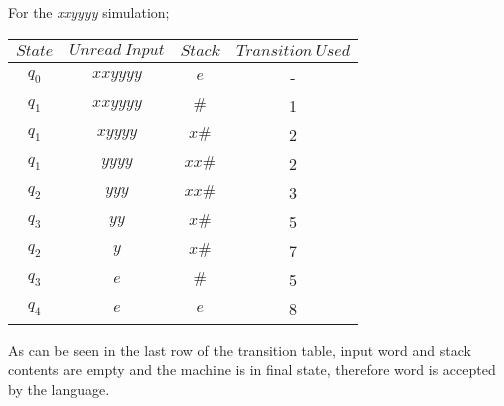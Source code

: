 \documentclass[a4paper,12pt]{article}
\begin{document}
\begin{tcolorbox}
For the \textit{xxyyyy} simulation;\\
	\begin{table}[H]
	\small
	\centering
	\begin{tabular}{|c|c|c|c|}	
	\hline
	$State$ & $Unread \ Input$ & $Stack$ & $Transition \ Used$\\
	\hline 
	$q_0$ & $xxyyyy$ & $e$ & -\\			
	$q_1$ & $xxyyyy$ & $\# $ & 1\\	
	$q_1$ & $xyyyy$  & $x\# $ & 2\\
	$q_1$ & $yyyy$   & $xx\# $ & 2\\
	$q_2$ & $yyy$   & $xx\# $ & 3\\	
	$q_3$ & $yy$ & $x\# $ & 5\\			
	$q_2$ & $y$ & $x\# $ & 7\\	
	$q_3$ & $e$  & $\# $ & 5\\
	$q_4$ & $e$   & $e$ & 8\\
	\hline 
	\end{tabular}
	\end{table}
As can be seen in the last row of the transition table, input word and stack contents are empty and the machine is in final state, therefore word is accepted by the language.
\end{tcolorbox}
\end{document}
